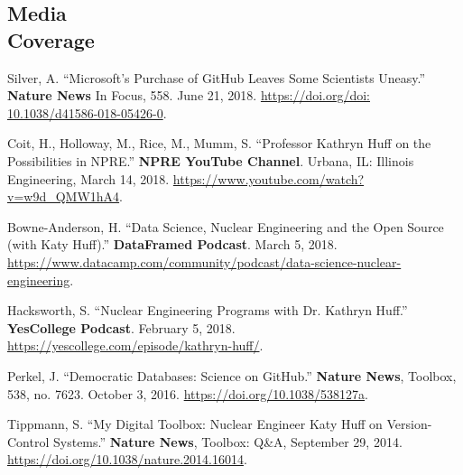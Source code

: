 \documentclass[margin,line]{resume}
\begin{document}
\begin{resume}
    \section{\mysidestyle Media\\Coverage}
    \begin{bibenum}
        \item Silver, A. ``Microsoft's Purchase of GitHub Leaves Some Scientists Uneasy.'' \textbf{Nature News} In Focus, 558. June 21, 2018. \url{https://doi.org/doi: 10.1038/d41586-018-05426-0}.
        \item Coit, H., Holloway, M., Rice, M.,  Mumm, S. ``Professor Kathryn Huff on the Possibilities in NPRE.'' \textbf{NPRE YouTube Channel}. Urbana, IL: Illinois Engineering, March 14, 2018. \url{https://www.youtube.com/watch?v=w9d_QMW1hA4}.
        \item Bowne-Anderson, H. ``Data Science, Nuclear Engineering and the
                Open Source (with Katy Huff).'' \textbf{DataFramed Podcast}.
                March 5, 2018. \\\url{https://www.datacamp.com/community/podcast/data-science-nuclear-engineering}.
        \item Hacksworth, S. ``Nuclear Engineering Programs with Dr. Kathryn Huff.'' \textbf{YesCollege Podcast}. February 5, 2018. \url{https://yescollege.com/episode/kathryn-huff/}.
        \item Perkel, J. ``Democratic Databases: Science on GitHub.'' \textbf{Nature News}, Toolbox, 538, no. 7623. October 3, 2016. \url{https://doi.org/10.1038/538127a}.
        \item Tippmann, S. ``My Digital Toolbox: Nuclear Engineer Katy Huff on Version-Control Systems.'' \textbf{Nature News}, Toolbox: Q\&A, September 29, 2014. \url{https://doi.org/10.1038/nature.2014.16014}.
        \end{bibenum}

\end{resume}
\end{document}
